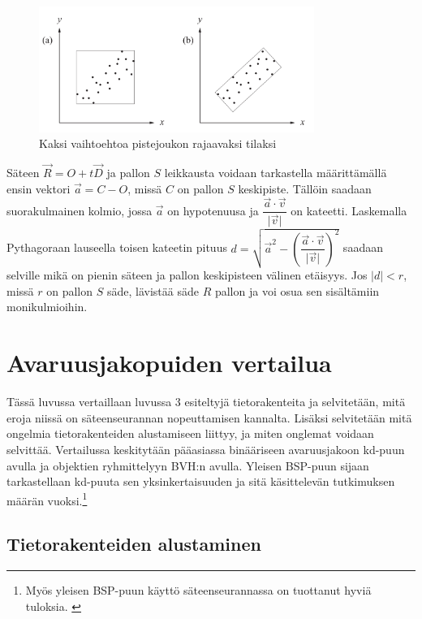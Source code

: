 \documentclass[a4paper, 12pt, titlepage]{article}
\newcommand{\abs}[1]{\vert #1 \vert} %
\begin{document}
\begin{figure}
 \centering 
 \includegraphics[width=0.8\textwidth]{img/bvh1.png}
 \vspace{0.4cm}
 \caption{Kaksi vaihtoehtoa pistejoukon rajaavaksi tilaksi \citep{lengyel}}%
 \vspace{-0.5cm} 
 \label{bvh1}
\end{figure}

Säteen $\vec{R}=O+t\vec{D}$ ja pallon $S$ leikkausta voidaan tarkastella määrittämällä ensin vektori $\vec{a} = C - O$, missä $C$ on pallon $S$ keskipiste. Tällöin saadaan suorakulmainen kolmio, jossa $\vec{a}$ on hypotenuusa ja $\dfrac{\vec{a}\cdot\vec{v}}{\abs{\vec{v}}}$ on kateetti. Laskemalla Pythagoraan lauseella toisen kateetin pituus $d = \sqrt{\vec{a}^2 - (\dfrac{\vec{a}\cdot\vec{v}}{\abs{\vec{v}}})^2}$ saadaan selville mikä on pienin säteen ja pallon keskipisteen välinen etäisyys. Jos $\abs{d} < r$, missä $r$ on pallon $S$ säde, lävistää säde $R$ pallon ja voi osua sen sisältämiin monikulmioihin. \citep[.]{janke}    


\newpage
\section{Avaruusjakopuiden vertailua}

Tässä luvussa vertaillaan luvussa 3 esiteltyjä tietorakenteita ja selvitetään, mitä eroja niissä on säteenseurannan nopeuttamisen kannalta. Lisäksi selvitetään mitä ongelmia tietorakenteiden alustamiseen liittyy, ja miten onglemat voidaan selvittää. Vertailussa keskitytään pääasiassa binääriseen avaruusjakoon kd-puun avulla ja objektien ryhmittelyyn BVH:n avulla. Yleisen BSP-puun sijaan tarkastellaan kd-puuta sen yksinkertaisuuden ja sitä käsittelevän tutkimuksen määrän vuoksi.\footnote{Myös yleisen BSP-puun käyttö säteenseurannassa on tuottanut hyviä tuloksia. \citep[ks. esim.][]{ranta}} 

\subsection{Tietorakenteiden alustaminen}
\end{document}
